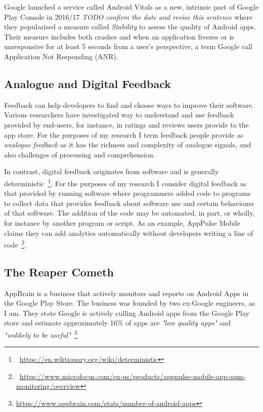 Google launched a service called Android Vitals as a new, intrinsic part of Google Play Console in 2016/17 \emph{TODO confirm the date and revise this sentence} where they popularised a measure called \emph{Stability} to assess the quality of Android apps. Their measure includes both crashes and when an application freezes or is unresponsive for at least 5 seconds from a user's perspective, a term Google call Application Not Responding (ANR).

\subsection{Analogue and Digital Feedback}
Feedback can help developers to find and choose ways to improve their software. Various researchers have investigated way to understand and use feedback provided by end-users, for instance, in ratings and reviews users provide to the app store. For the purposes of my research I term feedback people provide as \emph{analogue feedback} as it has the richness and complexity of analogue signals, and also challenges of processing and comprehension.

In contrast, digital feedback originates from software and is generally deterministic~\footnote{~\url{https://en.wiktionary.org/wiki/deterministic}}. For the purposes of my research I consider digital feedback as that provided by running software where programmers added code to programs to collect data that provides feedback about software use and certain behaviours of that software. The addition of the code may be automated, in part, or wholly, for instance by another program or script. As an example, AppPulse Mobile claims they can add analytics automatically without developers writing a line of code~\footnote{~\url{https://www.microfocus.com/en-us/products/apppulse-mobile-app-apm-monitoring/overview}}.



\subsection{The Reaper Cometh}
AppBrain is a business that actively monitors and reports on Android Apps in the Google Play Store. The business was founded by two ex-Google engineers, as I am. They state Google is actively culling Android apps from the Google Play store and estimate approximately 16\% of apps are \emph{"low quality apps"} and \emph{"unlikely to be useful"}~\footnote{\url{https://www.appbrain.com/stats/number-of-android-apps}} %


